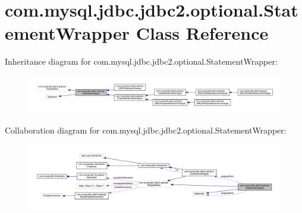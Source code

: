 \hypertarget{classcom_1_1mysql_1_1jdbc_1_1jdbc2_1_1optional_1_1_statement_wrapper}{}\section{com.\+mysql.\+jdbc.\+jdbc2.\+optional.\+Statement\+Wrapper Class Reference}
\label{classcom_1_1mysql_1_1jdbc_1_1jdbc2_1_1optional_1_1_statement_wrapper}


Inheritance diagram for com.\+mysql.\+jdbc.\+jdbc2.\+optional.\+Statement\+Wrapper\+:
\nopagebreak
\begin{figure}[H]
\begin{center}
\leavevmode
\includegraphics[width=350pt]{classcom_1_1mysql_1_1jdbc_1_1jdbc2_1_1optional_1_1_statement_wrapper__inherit__graph}
\end{center}
\end{figure}


Collaboration diagram for com.\+mysql.\+jdbc.\+jdbc2.\+optional.\+Statement\+Wrapper\+:
\nopagebreak
\begin{figure}[H]
\begin{center}
\leavevmode
\includegraphics[width=350pt]{classcom_1_1mysql_1_1jdbc_1_1jdbc2_1_1optional_1_1_statement_wrapper__coll__graph}
\end{center}
\end{figure}
